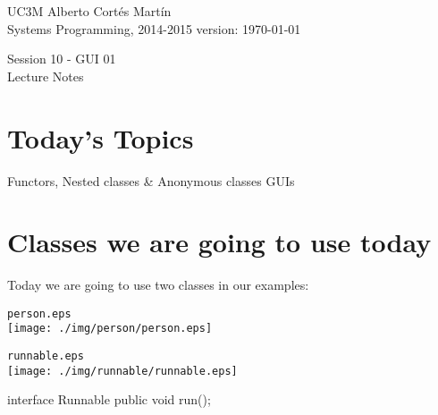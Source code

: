 \documentclass[a4paper, 9pt]{extarticle}
\newcommand{\realtitle}{Session 10 - GUI 01}
\begin{document}
\makebox[\linewidth]{\rule{\textwidth}{0.4pt}}
UC3M \hfill Alberto Cortés Martín\\
Systems Programming, 2014-2015 \hfill version: \today\\
\makebox[\linewidth]{\rule{\textwidth}{0.4pt}}
\begin{center}
  \Large{\realtitle}\\Lecture Notes
\end{center}
\makebox[\linewidth]{\rule{\textwidth}{0.4pt}}
\vspace{1cm}


\section{Today's Topics}
\begin{blackboard}
Functors, Nested classes & Anonymous classes
GUIs
\end{blackboard}







\section{Classes we are going to use today}

Today we are going to use two classes in our examples:

\begin{multicols}{2}
  \begin{center}
    \verb+person.eps+\\
    \texttt{[image: ./img/person/person.eps]}
  \end{center}
  \columnbreak
\end{multicols}

\begin{multicols}{2}
  \begin{center}
    \verb+runnable.eps+\\
    \texttt{[image: ./img/runnable/runnable.eps]}
  \end{center}
  \columnbreak
  \begin{blackboard}
interface Runnable {
    public void run();
}
\end{blackboard}
\end{multicols}
\end{document}
